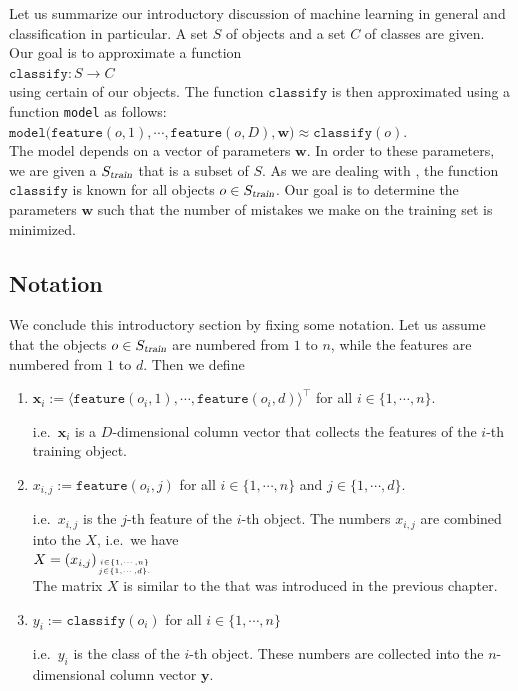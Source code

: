 Let us summarize our introductory discussion of machine learning in general and classification in particular.
A set $S$ of objects and a set $C$ of classes are given.  Our goal is to approximate a function
\\[0.2cm]
\hspace*{1.3cm}
$\mathtt{classify}: S \rightarrow C$
\\[0.2cm]
using certain   of our objects.  The function $\mathtt{classify}$ is then approximated using a function
\texttt{model} as follows:
\\[0.2cm]
\hspace*{1.3cm}
$\mathtt{model}\bigl(\mathtt{feature}(o,1), \cdots, \mathtt{feature}(o,D), \mathbf{w}\bigr) \approx \mathtt{classify}(o)$.
\\[0.2cm]
The model depends on a vector of parameters $\mathbf{w}$.  In order to  these parameters, we are given a 
 $S_\textsl{train}$ that is a subset of $S$.  As we are dealing with ,
 the function 
$\mathtt{classify}$ is known for all objects $o \in S_\textsl{train}$.   Our goal is to determine the parameters $\mathbf{w}$ such that the
number of mistakes we make on the training set is minimized.  

\subsection{Notation}
We conclude this introductory section by fixing some notation.  Let us assume that the objects $o \in S_\textsl{train}$
are numbered 
from $1$ to $n$, while the features are numbered from $1$ to $d$.  Then we define
\begin{enumerate}
\item $\textbf{x}_i := \langle\mathtt{feature}(o_i, 1), \cdots, \mathtt{feature}(o_i, d)\rangle^\top$ \quad for all $i \in \{1, \cdots, n\}$.

      i.e.~$\mathbf{x}_i$ is a $D$-dimensional column vector that collects the features of the $i$-th training object.
\item $x_{i,j} := \mathtt{feature}(o_i, j)$ \quad for all $i \in \{1, \cdots, n\}$ and $j \in \{1, \cdots, d\}$.

      i.e.~$x_{i,j}$ is the $j$-th feature of the $i$-th object.  The numbers $x_{i,j}$ are combined into the
       $X$,  i.e.~we have
      \\[0.2cm]
      \hspace*{1.3cm}
      $X=(x_{i,j})_{i\in\{1,\cdots,n\} \atop j \in \{1,\cdots,d\}.}$
      \\[0.2cm]
      The matrix $X$ is similar to the  that was introduced in the previous chapter.
\item $y_i := \mathtt{classify}(o_i)$ \quad for all $i \in \{1, \cdots, n\}$

      i.e.~$y_i$ is the class of the $i$-th object.  These numbers are collected into the $n$-dimensional column vector $\mathbf{y}$.
\end{enumerate}

